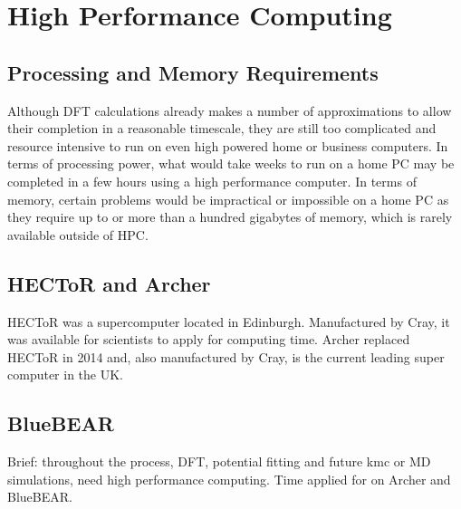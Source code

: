 \section{High Performance Computing}

\subsection{Processing and Memory Requirements}

Although DFT calculations already makes a number of approximations to allow their completion in a reasonable timescale, they are still too complicated and resource intensive to run on even high powered home or business computers.  In terms of processing power, what would take weeks to run on a home PC may be completed in a few hours using a high performance computer.  In terms of memory, certain problems would be impractical or impossible on a home PC as they require up to or more than a hundred gigabytes of memory, which is rarely available outside of HPC.



\subsection{HECToR and Archer}

HECToR was a supercomputer located in Edinburgh.  Manufactured by Cray, it was available for scientists to apply for computing time.  Archer replaced HECToR in 2014 and, also manufactured by Cray, is the current leading super computer in the UK.  

\subsection{BlueBEAR}


Brief: throughout the process, DFT, potential fitting and future kmc or MD simulations, need high performance computing.  Time applied for on Archer and BlueBEAR.
